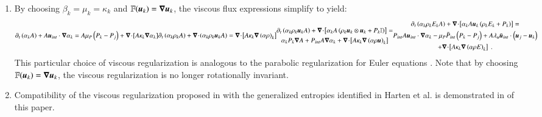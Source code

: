 \documentclass[preprint,10pt]{elsarticle}
\begin{document}
\begin{enumerate}
\item{By choosing $\beta_k = \mu_k = \kappa_k$ and $\mathbb{F}(\boldsymbol u_k) = \boldsymbol\nabla \boldsymbol u_k$, the viscous flux expressions simplify to yield: 
\begin{subequations}\label{eq:sev_equ-parab}
\begin{align}\label{eq:sev_equ-parab-vf}
\partial_t \left( \alpha_k  A\right) + A \mbold u_{int} \cdot \grad \alpha_k = A \mu_P \left( P_k - P_j \right) + \div \left[ A \kappa_k \grad \alpha_k \right]
\end{align}
\begin{align}\label{eq:sev_equ-parab-cont}
\partial_t \left( \alpha_k \rho_k A \right) + \div \left( \alpha_k \rho_k \mbold u_k A \right) = \div \left[ A \kappa_k \grad \left( \alpha \rho \right)_k \right]
\end{align}
\begin{multline}\label{eq:sev_equ-parab-mom}
\partial_t \left( \alpha_k \rho_k \mbold u_k A \right) + \div \left[ \alpha_k A \left( \rho_k \mbold u_k \otimes \mbold u_k + P_k \mathbb{I} \right) \right] = \\
\alpha_k P_k \grad A + P_{int} A \grad \alpha_k + \div \left[ A \kappa_k \grad \left( \alpha \rho \mbold u  \right)_k \right] 
\end{multline}
\begin{multline}\label{eq:sev_equ-parab-ener}
\partial_t \left( \alpha_k \rho_k E_k A \right) + \div \left[ \alpha_k A \mbold u_k \left( \rho_k E_k + P_k \right) \right] = \\
P_{int} A \mbold u_{int} \cdot \grad \alpha_k -
\mu_P \bar{P}_{int} \left( P_k-P_j \right) + 
A \lambda_u \bar{\mbold u}_{int} \cdot \left( \mbold u_j - \mbold u_k \right)  \\
+ \div \left[A \kappa_k \grad \left( \alpha \rho E \right)_k \right] \ .
\end{multline} 
\end{subequations}
This particular choice of viscous regularization is analogous to the parabolic regularization for Euler equations \cite{Parabolic}. 
Note that by choosing $\mathbb{F}(\boldsymbol u_k) = \boldsymbol\nabla \boldsymbol u_k$, the viscous regularization is no longer rotationally invariant.
}
    
\item{Compatibility of the viscous regularization proposed in  with the generalized entropies identified 
in Harten et al. \cite{Harten} is demonstrated in  of this paper. } 
\end{enumerate}
\end{document}
